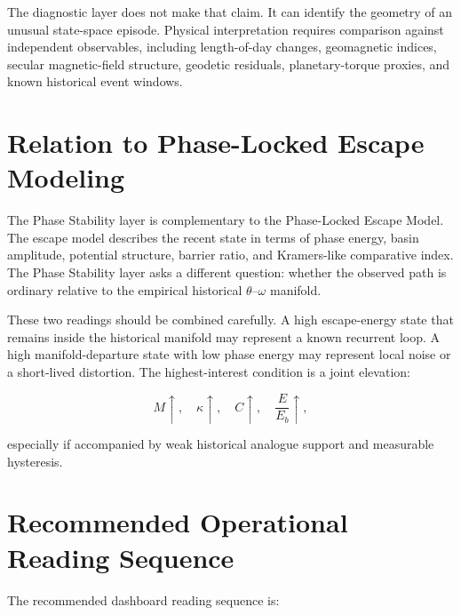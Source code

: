 \documentclass[11pt]{article}
\begin{document}
The diagnostic layer does not make that claim. It can identify the geometry of an unusual state-space episode. Physical interpretation requires comparison against independent observables, including length-of-day changes, geomagnetic indices, secular magnetic-field structure, geodetic residuals, planetary-torque proxies, and known historical event windows.

\section{Relation to Phase-Locked Escape Modeling}

The Phase Stability layer is complementary to the Phase-Locked Escape Model. The escape model describes the recent state in terms of phase energy, basin amplitude, potential structure, barrier ratio, and Kramers-like comparative index. The Phase Stability layer asks a different question: whether the observed path is ordinary relative to the empirical historical \(\theta\)--\(\omega\) manifold.

These two readings should be combined carefully. A high escape-energy state that remains inside the historical manifold may represent a known recurrent loop. A high manifold-departure state with low phase energy may represent local noise or a short-lived distortion. The highest-interest condition is a joint elevation:

\begin{equation}
M \uparrow,\quad
\kappa \uparrow,\quad
C \uparrow,\quad
\frac{E}{E_b} \uparrow,
\end{equation}

especially if accompanied by weak historical analogue support and measurable hysteresis.

\section{Recommended Operational Reading Sequence}

The recommended dashboard reading sequence is:
\end{document}
